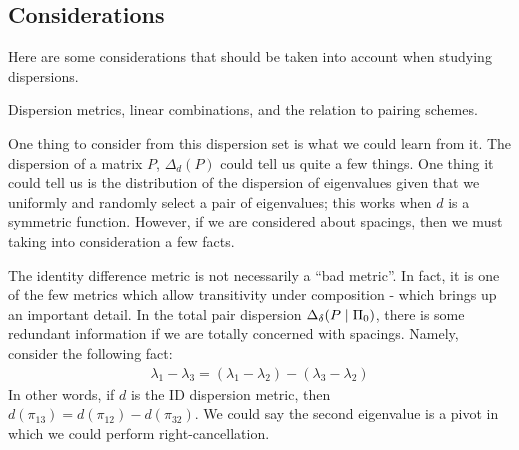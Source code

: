 \subsection{Considerations}

Here are some considerations that should be taken into account when studying dispersions.

Dispersion metrics, linear combinations, and the relation to pairing schemes.


One thing to consider from this dispersion set is what we could learn from it.
The dispersion of a matrix $P$, $\Delta_d(P)$ could tell us quite a few things.
One thing it could tell us is the distribution of the dispersion of eigenvalues given that we uniformly and randomly select a pair of eigenvalues;
this works when $d$ is a symmetric function. However, if we are considered about spacings, then we must taking into consideration a few facts.
\newline
\medskip

 The identity difference metric is not necessarily a ``bad metric''.
In fact, it is one of the few metrics which allow transitivity under composition - which brings up an important detail.
In the total pair dispersion $\Delta_\delta(P \mid \Pi_0)$, there is some redundant information if we are totally concerned with spacings. Namely, consider the following fact:
\begin{align*}
\lambda_1 - \lambda_3 = (\lambda_1 - \lambda_2) - (\lambda_3 - \lambda_2)
\end{align*}
In other words, if $d$ is the ID dispersion metric, then $d(\pi_{13}) = d(\pi_{12}) - d(\pi_{32})$.
We could say the second eigenvalue is a pivot in which we could perform right-cancellation.
\newline
\medskip

